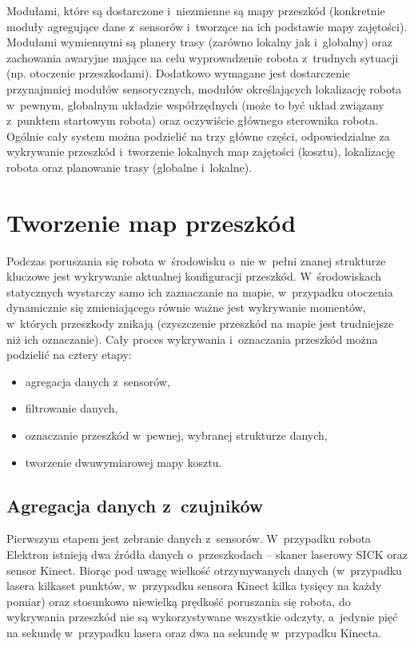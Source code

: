 Modułami, które są dostarczone i~niezmienne są mapy przeszkód (konkretnie
moduły agregujące dane z~sensorów i~tworzące na ich podstawie mapy zajętości).
Modułami wymiennymi są planery trasy (zarówno lokalny jak i~globalny) oraz
zachowania awaryjne mające na celu wyprowadzenie robota z~trudnych sytuacji
(np. otoczenie przeszkodami). Dodatkowo wymagane jest dostarczenie przynajmniej
modułów sensorycznych, modułów określających lokalizację robota w~pewnym,
globalnym układzie współrzędnych (może to być układ związany z~punktem startowym
robota) oraz oczywiście głównego sterownika robota. Ogólnie cały system można
podzielić na trzy główne części, odpowiedzialne za wykrywanie przeszkód 
i~tworzenie lokalnych map zajętości (kosztu), lokalizację robota oraz planowanie
trasy (globalne i~lokalne).

\section{Tworzenie map przeszkód}

Podczas poruszania się robota w~środowisku o~nie w~pełni znanej strukturze
kluczowe jest wykrywanie aktualnej konfiguracji przeszkód. W~środowiskach
statycznych wystarczy samo ich zaznaczanie na mapie, w~przypadku otoczenia
dynamicznie się zmieniającego równie ważne jest wykrywanie momentów, w~których
przeszkody znikają (czyszczenie przeszkód na mapie jest trudniejsze niż ich
oznaczanie). Cały proces wykrywania i~oznaczania przeszkód można podzielić na
cztery etapy:

\begin{itemize}
  \item agregacja danych z~sensorów,
  \item filtrowanie danych,
  \item oznaczanie przeszkód w~pewnej, wybranej strukturze danych,
  \item tworzenie dwuwymiarowej mapy kosztu.
\end{itemize}

\subsection{Agregacja danych z~czujników}

Pierwszym etapem jest zebranie danych z~sensorów. W~przypadku robota Elektron
istnieją dwa źródła danych o~przeszkodach -- skaner laserowy SICK oraz sensor
Kinect. Biorąc pod uwagę wielkość otrzymywanych danych (w~przypadku lasera
kilkaset punktów, w~przypadku sensora Kinect kilka tysięcy na każdy pomiar) oraz
stosunkowo niewielką prędkość poruszania się robota, do wykrywania przeszkód
nie są wykorzystywane wszystkie odczyty, a~jedynie pięć na sekundę w~przypadku
lasera oraz dwa na sekundę w~przypadku Kinecta.

